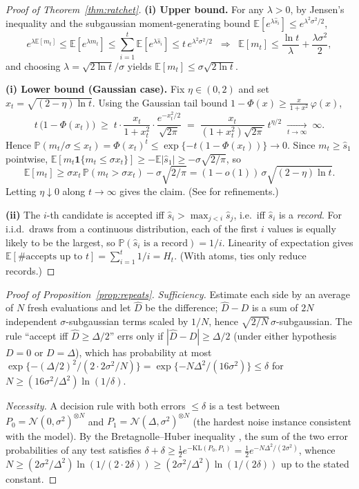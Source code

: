 \documentclass{article}
\theoremstyle{plain}
\theoremstyle{definition}
\theoremstyle{remark}
\newcommand{\E}{\mathbb{E}}
\renewcommand{\P}{\mathbb{P}}
\begin{document}
\begin{proof}[Proof of Theorem~\ref{thm:ratchet}]
\textbf{(i) Upper bound.} For any $\lambda > 0$, by Jensen's inequality and the subgaussian moment-generating bound $\E[e^{\lambda \hat{s}_i}] \le e^{\lambda^2\sigma^2/2}$,
\[
e^{\lambda \E[m_t]} \le \E[e^{\lambda m_t}] \le \sum_{i=1}^{t} \E[e^{\lambda \hat{s}_i}] \le t\, e^{\lambda^2 \sigma^2 / 2}
\;\;\Longrightarrow\;\;
\E[m_t] \le \frac{\ln t}{\lambda} + \frac{\lambda \sigma^2}{2},
\]
and choosing $\lambda = \sqrt{2 \ln t}/\sigma$ yields $\E[m_t] \le \sigma \sqrt{2 \ln t}$.

\textbf{(i) Lower bound (Gaussian case).} Fix $\eta \in (0,2)$ and set $x_t = \sqrt{(2-\eta)\ln t}$. Using the Gaussian tail bound $1 - \Phi(x) \ge \frac{x}{1+x^2}\,\varphi(x)$,
\[
t\,\big(1 - \Phi(x_t)\big) \;\ge\; t \cdot \frac{x_t}{1+x_t^2} \cdot \frac{e^{-x_t^2/2}}{\sqrt{2\pi}}
\;=\; \frac{x_t}{(1+x_t^2)\sqrt{2\pi}} \; t^{\eta/2} \;\xrightarrow[t \to \infty]{}\; \infty .
\]
Hence $\P(m_t/\sigma \le x_t) = \Phi(x_t)^t \le \exp\{-t(1-\Phi(x_t))\} \to 0$. Since $m_t \ge \hat{s}_1$ pointwise, $\E[m_t \mathbf{1}\{m_t \le \sigma x_t\}] \ge -\E|\hat{s}_1| \ge -\sigma\sqrt{2/\pi}$, so
\[
\E[m_t] \ge \sigma x_t \,\P(m_t > \sigma x_t) - \sigma\sqrt{2/\pi} = (1-o(1))\,\sigma\sqrt{(2-\eta) \ln t}.
\]
Letting $\eta \downarrow 0$ along $t \to \infty$ gives the claim. (See \citealp{boucheron2013concentration} for refinements.)

\textbf{(ii)} The $i$-th candidate is accepted iff $\hat{s}_i > \max_{j < i} \hat{s}_j$, i.e.\ iff $\hat s_i$ is a \emph{record}. For i.i.d.\ draws from a continuous distribution, each of the first $i$ values is equally likely to be the largest, so $\P(\hat{s}_i \text{ is a record}) = 1/i$. Linearity of expectation gives $\E[\#\text{accepts up to } t] = \sum_{i=1}^t 1/i = H_t$. (With atoms, ties only reduce records.)
\end{proof}

\begin{proof}[Proof of Proposition~\ref{prop:repeats}]
\emph{Sufficiency.} Estimate each side by an average of $N$ fresh evaluations and let $\widehat{D}$ be the difference; $\widehat{D} - D$ is a sum of $2N$ independent $\sigma$-subgaussian terms scaled by $1/N$, hence $\sqrt{2/N}\,\sigma$-subgaussian. The rule ``accept iff $\widehat{D} \ge \Delta/2$'' errs only if $|\widehat{D} - D| \ge \Delta/2$ (under either hypothesis $D = 0$ or $D = \Delta$), which has probability at most $\exp\{-(\Delta/2)^2 / (2 \cdot 2\sigma^2/N)\} = \exp\{-N\Delta^2/(16\sigma^2)\} \le \delta$ for $N \ge (16\sigma^2/\Delta^2)\ln(1/\delta)$.

\emph{Necessity.} A decision rule with both errors $\le \delta$ is a test between $P_0 = \mathcal{N}(0, \sigma^2)^{\otimes N}$ and $P_1 = \mathcal{N}(\Delta, \sigma^2)^{\otimes N}$ (the hardest noise instance consistent with the model). By the Bretagnolle--Huber inequality \cite{tsybakov2009introduction}, the sum of the two error probabilities of any test satisfies $\delta + \delta \ge \tfrac{1}{2} e^{-\mathrm{KL}(P_0, P_1)} = \tfrac{1}{2} e^{-N\Delta^2/(2\sigma^2)}$, whence $N \ge (2\sigma^2/\Delta^2) \ln(1/(2\cdot 2\delta)) \ge (2\sigma^2/\Delta^2)\ln(1/(2\delta))$ up to the stated constant.
\end{proof}
\end{document}
